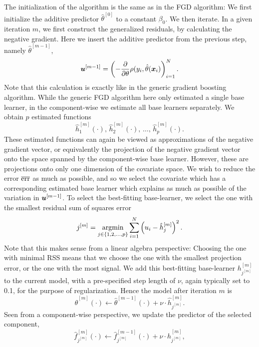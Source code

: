 The initialization of the algorithm is the same as in the FGD algorithm:
We first initialize the additive predictor $\hat{\theta}^{[0]}$ to a constant $\beta_0$.
We then iterate.
In a given iteration $m$, we first construct the generalized residuals, by calculating the negative gradient.
Here we insert the additive predictor from the previous step, namely $\hat{\theta}^{[m-1]}$,
\begin{equation*}
    \bm{u}^{[m-1]}=\left(-\frac{\partial}{\partial \theta}\rho(y_i, \hat{\theta}(\bm{x}_i)\right)_{i=1}^N.
\end{equation*}
Note that this calculation is exactly like in the generic gradient boosting algorithm.
While the generic FGD algorithm here only estimated a single base learner, in the component-wise we estimate all base learners separately.
We obtain $p$ estimated functions
\begin{equation*}
    \hat{h}_1^{[m]}(\cdot),\,\hat{h}_2^{[m]}(\cdot),\,\ldots,\,\hat{h}_p^{[m]}(\cdot).
\end{equation*}
These estimated functions can again be viewed as approximations of the negative gradient vector, or equivalently the projection of the negative gradient vector onto the space spanned by the component-wise base learner.
However, these are projections onto only one dimension of the covariate space.
We wish to reduce the error $\overline{\text{err}}$ as much as possible, and so we select the covariate which has a corresponding estimated base learner which explains as much as possible of the variation in $\bm{u}^{[m-1]}$.
To select the best-fitting base-learner, we select the one with the smallest residual sum of squares error
\begin{equation*}
    j^{[m]}=\operatorname*{argmin}_{j\in\{1,2,\ldots,p\}}\sum_{i=1}^N \left(u_i-\hat{h}_j^{[m]}\right)^2.
\end{equation*}
Note that this makes sense from a linear algebra perspective:
Choosing the one with minimal RSS means that we choose the one with the smallest projection error, or the one with the most signal.
We add this best-fitting base-learner $h_{j^{[m]}}^{[m]}$ to the current model, with a pre-specified step length of $\nu$, again typically set to 0.1, for the purpose of regularization.
Hence the model after iteration $m$ is
\begin{equation*}
    \hat{\theta}^{[m]}(\cdot)\gets \hat{\theta}^{[m-1]}(\cdot)+\nu\cdot\hat{h}^{[m]}_{j^{[m]}}.
\end{equation*}
Seen from a component-wise perspective, we update the predictor of the selected component,
\begin{equation*}
    \hat{f}_{j^{[m]}}^{[m]}(\cdot)\gets \hat{f}_{j^{[m]}}^{[m-1]}(\cdot)+\nu\cdot\hat{h}^{[m]}_{j^{[m]}},
\end{equation*}
